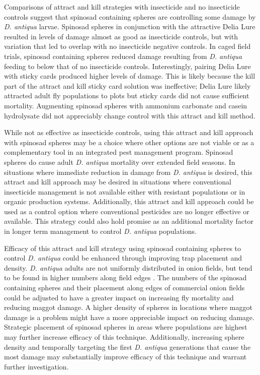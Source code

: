 \documentclass[alpha-refs]{wiley-article}
\begin{document}
Comparisons of attract and kill strategies with insecticide and no insecticide controls suggest that spinosad containing spheres are controlling some damage by \textit{D. antiqua} larvae.  Spinosad spheres in conjunction with the attractive Delia Lure resulted in levels of damage almost as good as insecticide controls, but with variation that led to overlap with no insecticide negative controls.  In caged field trials, spinosad containing spheres reduced damage resulting from \textit{D. antiqua} feeding to below that of no insecticide controls.  Interestingly, pairing Delia Lure with sticky cards produced higher levels of damage.  This is likely because the kill part of the attract and kill sticky card solution was ineffective; Delia Lure likely attracted adult fly populations to plots but sticky cards did not cause sufficient mortality.  Augmenting spinosad spheres with ammonium carbonate and casein hydrolysate did not appreciably change control with this attract and kill method.  

While not as effective as insecticide controls, using this attract and kill approach with spinosad spheres may be a choice where other options are not viable or as a complementary tool in an integrated pest management program.  Spinosad spheres do cause adult \textit{D. antiqua} mortality over extended field seasons.  In situations where immediate reduction in damage from \textit{D. antiqua} is desired, this attract and kill approach may be desired in situations where conventional insecticide management is not available either with resistant populations or in organic production systems.  Additionally, this attract and kill approach could be used as a control option where conventional pesticides are no longer effective or available. This strategy could also hold promise as an additional mortality factor in longer term management to control \textit{D. antiqua} populations.  

Efficacy of this attract and kill strategy using spinosad containing spheres to control \textit{D. antiqua} could be enhanced through improving trap placement and density.  \textit{D. antiqua} adults are not uniformly distributed in onion fields, but tend to be found in higher numbers along field edges \citep{werling2006spatial}.  The numbers of the spinosad containing spheres and their placement along edges of commercial onion fields could be adjusted to have a greater impact on increasing fly mortality and reducing maggot damage.  A higher density of spheres in locations where maggot damage is a problem might have a more appreciable impact on reducing damage. Strategic placement of spinosad spheres in areas where populations are highest may further increase efficacy of this technique.  Additionally, increasing sphere density and temporally targeting the first \textit{D. antiqua} generations that cause the most damage may substantially improve efficacy of this technique and warrant further investigation.  
\end{document}
